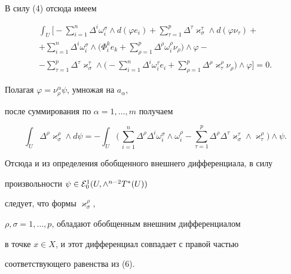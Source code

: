 \begin{pf}
\begin{gather*}
\end{gather*}


В силу (4) отсюда имеем


\begin{gather*}


\int_{U}\biggl[-\sum_{i=1}^{n}\Delta^i\omega^{\sigma}_i\wedge d(\varphi e_i)+


\sum_{\tau=1}^{p}\Delta^{\tau}\varkappa^{\tau}_{\sigma}\wedge


d(\varphi\nu_{\tau})+\\


+\sum_{i=1}^{n}\Delta^i\omega^{\sigma}_i\wedge\biggl(\Phi^k_ie_k+


\sum_{\rho=1}^{p}\Delta^{\rho}\omega^{\rho}_i\nu_{\rho}\biggr)


\wedge\varphi-\\


-\sum_{\tau=1}^{p}\Delta^{\tau}\varkappa^{\tau}_{\sigma}


\wedge\biggl(-\sum_{i=1}^{n}\Delta^i\omega^{\tau}_ie_i+


\sum_{\rho=1}^{p}\Delta^{\rho}\varkappa^{\rho}_{\tau}\nu_{\rho}


\biggr)\wedge\varphi\biggr]=0.


\end{gather*}


Полагая $\varphi= \nu^{\alpha}_{\rho}\psi$, умножая на $a_{\alpha}$,


после суммирования по $\alpha= 1,\ldots,m$ получаем


$$


\int_{U}\Delta^{\rho}\varkappa^{\rho}_{\sigma}\wedge d\psi=


-\int_{U}\biggl(\,\sum_{i=1}^{n}\Delta^{\rho}\Delta^i


\omega^{\sigma}_i\wedge\omega^{\rho}_i-


\sum_{\tau=1}^{p}\Delta^{\rho}\Delta^{\tau}\varkappa^{\tau}_{\sigma}


\wedge\varkappa^{\rho}_{\tau}\biggr)\wedge\psi.


$$


Отсюда и из определения обобщенного внешнего дифференциала, в силу


произвольности $\psi\in {\cal E}^1_0(U,\wedge^{n-2}T^*(U))$


следует, что формы $\varkappa^{\rho}_{\sigma}$,


$\rho,\sigma= 1,\ldots,p$, обладают обобщенным внешним дифференциалом


в точке $x\in X$, и этот дифференциал совпадает с правой частью


соответствующего равенства из (6).


\end{pf}





